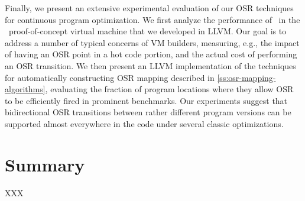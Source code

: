 Finally, we present an extensive experimental evaluation of our OSR techniques for continuous program optimization. We first analyze the performance of \osrkit\ in the \tinyvm\ proof-of-concept virtual machine that we developed in LLVM. Our goal is to address a number of typical concerns of VM builders, measuring, e.g., the impact of having an OSR point in a hot code portion, and the actual cost of performing an OSR transition. We then present an LLVM implementation of the techniques for automatically constructing OSR mapping described in \mysection\ref{ss:osr-mapping-algorithms}, evaluating the fraction of program locations where they allow OSR to be efficiently fired in prominent benchmarks. Our experiments suggest that bidirectional OSR transitions between rather different program versions can be supported almost everywhere in the code under several classic optimizations.

\ifdefined \noauthorea



\fi

\section{Summary}
XXX